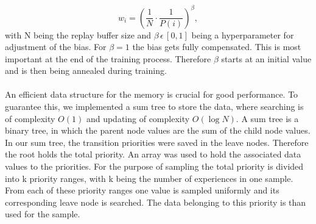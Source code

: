 \begin{equation}
w_{i}=\left(\frac{1}{N} \cdot \frac{1}{P(i)}\right)^{\beta},
\end{equation}
with N being the replay buffer size and $\beta\,\epsilon\,[0,1]$ being a hyperparameter for  adjustment of the bias. 
For $\beta=1$ the bias gets fully compensated. This is most important at the end of the training process. Therefore $\beta$ starts at an initial value and is then being annealed during training. \\\\
An efficient data structure for the memory is crucial for good performance.
To guarantee this, we implemented a sum tree to store the data, where searching is of complexity $O(1)$ and updating of complexity $O(\log N)$.
A sum tree is a binary tree, in which the parent node values are the sum of the child node values. In our sum tree, the transition priorities were saved in the leave nodes. Therefore the root holds the total priority. An array was used to hold the associated data values to the priorities. For the purpose of sampling the total priority is divided into k priority ranges, with k being the number of experiences in one sample.
From each of these priority ranges one value is sampled uniformly and its corresponding leave node is searched. The data belonging to this priority is than used for the sample.

